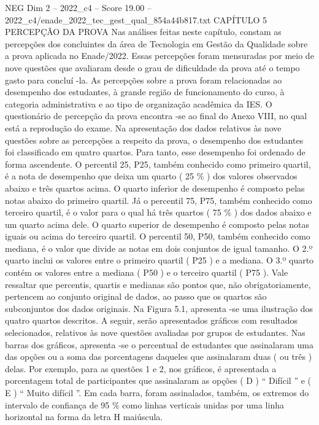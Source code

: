 \begin{textsample}{NEG Dim 2 – 2022\_c4 – Score 19.00 – 2022\_c4/enade\_2022\_tec\_gest\_qual\_854a44b817.txt}  \label{ex:f2_neg_411}
CAPÍTULO 5 PERCEPÇÃO DA PROVA Nas análises feitas neste capítulo, constam as percepções dos concluintes da área de Tecnologia em Gestão da Qualidade sobre a prova aplicada no Enade/2022.
Essas percepções foram mensuradas por meio de nove questões que avaliaram desde o grau de dificuldade da prova até o tempo gasto para concluí -la.
As percepções sobre a prova foram relacionadas ao desempenho dos estudantes, à grande região de funcionamento do curso, à categoria administrativa e ao tipo de organização acadêmica da IES.
O questionário de percepção da prova encontra -se ao final do Anexo VIII, no qual está a reprodução do exame.
Na apresentação dos dados relativos às nove questões sobre as percepções a respeito da prova, o desempenho dos estudantes foi classificado em quatro quartos.
Para tanto, esse desempenho foi ordenado de forma ascendente.
O percentil 25, P25, também conhecido como primeiro quartil, é a nota de desempenho que deixa um quarto ( 25 \% ) dos valores observados abaixo e três quartos acima.
O quarto inferior de desempenho é composto pelas notas abaixo do primeiro quartil.
Já o percentil 75, P75, também conhecido como terceiro quartil, é o valor para o qual há três quartos ( 75 \% ) dos dados abaixo e um quarto acima dele.
O quarto superior de desempenho é composto pelas notas iguais ou acima do terceiro quartil.
O percentil 50, P50, também conhecido como mediana, é o valor que divide as notas em dois conjuntos de igual tamanho.
O 2.º quarto inclui os valores entre o primeiro quartil ( P25 ) e a mediana.
O 3.º quarto contém os valores entre a mediana ( P50 ) e o terceiro quartil ( P75 ).
Vale ressaltar que percentis, quartis e medianas são pontos que, não obrigatoriamente, pertencem ao conjunto original de dados, ao passo que os quartos são subconjuntos dos dados originais.
Na Figura 5.1, apresenta -se uma ilustração dos quatro quartos descritos.
A seguir, serão apresentados gráficos com resultados selecionados, relativos às nove questões avaliadas por grupos de estudantes.
Nas barras dos gráficos, apresenta -se o percentual de estudantes que assinalaram uma das opções ou a soma das porcentagens daqueles que assinalaram duas ( ou três ) delas.
Por exemplo, para as questões 1 e 2, nos gráficos, é apresentada a porcentagem total de participantes que assinalaram as opções ( D ) “ Difícil ” e ( E ) “ Muito difícil ”.
Em cada barra, foram assinalados, também, os extremos do intervalo de confiança de 95 \% como linhas verticais unidas por uma linha horizontal na forma da letra H maiúscula.

\end{textsample}
